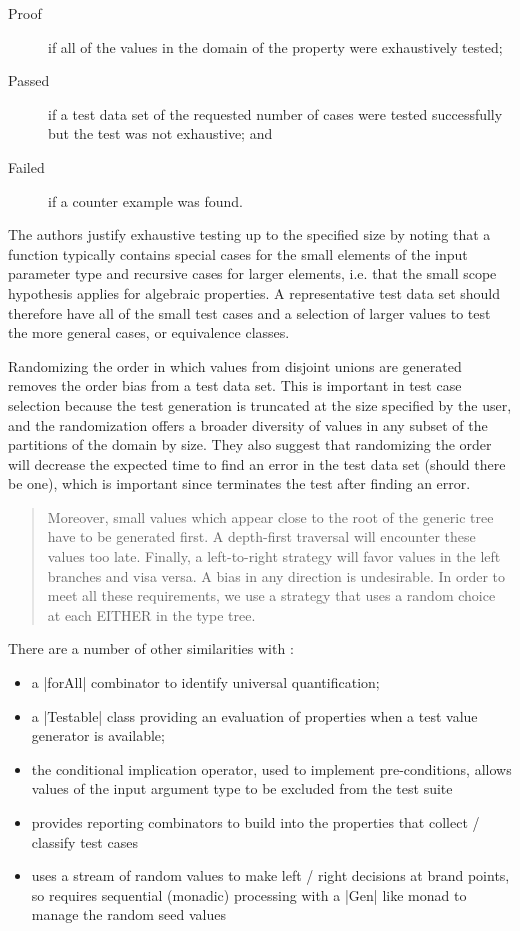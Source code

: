 \begin{description}
\item [Proof] if all of the values in the domain of the property were exhaustively tested;
\item [Passed] if a test data set of the requested number of cases were tested successfully
but the test was not exhaustive; and
\item [Failed] if a counter example was found.
\end{description}

The authors justify exhaustive testing up to the specified size
by noting that a function typically contains 
special cases for the small elements of the input parameter type
and recursive cases for larger elements,
i.e. that the small scope hypothesis applies for algebraic properties.
A representative test data set should therefore have 
all of the small test cases and
a selection of larger values to test the more general cases, or equivalence classes.

Randomizing the order in which values from disjoint unions are generated
removes the order bias from a test data set.
This is important in \GAST test case selection because
the test generation is truncated at the size specified by the user,
and the randomization offers a broader diversity of values in any subset of
the partitions of the domain by size.
They also suggest that randomizing the order will
decrease the expected time to find an error in the test data set (should there be one),
which is important since \GAST terminates the test after finding an error.

\begin{quote}
Moreover, small values which appear close to the root of the generic tree have to be generated first. 
A depth-first traversal will encounter these values too late. 
Finally, a left-to-right strategy will favor values in the left branches and visa versa. 
A bias in any direction is undesirable.
In order to meet all these requirements, 
we use a strategy that uses a random choice at each EITHER in the type tree.
\end{quote}

There are a number of other similarities with \QC:
\begin{itemize}
\item a |forAll| combinator to identify universal quantification;
\item a |Testable| class providing an evaluation of properties 
when a test value generator is available;
\item the conditional implication operator, used to implement pre-conditions,
allows values of the input argument type to be excluded from the test suite 
\item provides reporting combinators to build into the properties that collect / classify test cases
\item uses a stream of random values to make left / right decisions at brand points,
so requires sequential (monadic) processing with a |Gen| like monad to manage the random seed values
\end{itemize}

